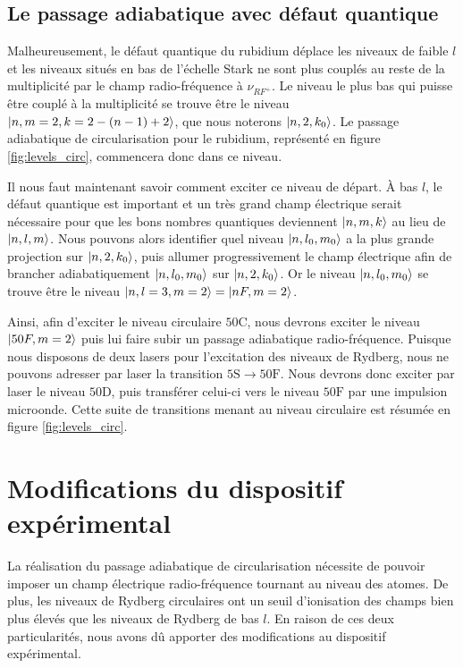 \subsection{Le passage adiabatique avec défaut quantique}
\noindent Malheureusement, le défaut quantique du rubidium déplace les niveaux de faible $l$ et les niveaux situés en bas de l'échelle Stark ne sont plus couplés au reste de la multiplicité par le champ radio-fréquence à $\nu_{RF^+}$.
Le niveau le plus bas qui puisse être couplé à la multiplicité se trouve être le niveau $\ket{n,m=2,k=2-(n-1)+2}$, que nous noterons $\ket{n,2,k_0}$.
Le passage adiabatique de circularisation pour le rubidium, représenté en figure \eqref{fig:levels_circ}, commencera donc dans ce niveau.

Il nous faut maintenant savoir comment exciter ce niveau de départ.
\`A bas $l$, le défaut quantique est important et un très grand champ électrique serait nécessaire pour que les bons nombres quantiques deviennent $\ket{n,m,k}$ au lieu de $\ket{n,l,m}$.
Nous pouvons alors identifier quel niveau $\ket{n,l_0,m_0}$ a la plus grande projection sur $\ket{n,2,k_0}$, puis allumer progressivement le champ électrique afin de brancher adiabatiquement $\ket{n,l_0,m_0}$ sur $\ket{n,2,k_0}$.
Or le niveau $\ket{n,l_0,m_0}$ se trouve être le niveau $\ket{n,l=3,m=2}=\ket{nF,m=2}$.

Ainsi, afin d'exciter le niveau circulaire $\mathrm{50C}$, nous devrons exciter le niveau $\ket{50F,m=2}$ puis lui faire subir un passage adiabatique radio-fréquence.
Puisque nous disposons de deux lasers pour l'excitation des niveaux de Rydberg, nous ne pouvons adresser par laser la transition $\mathrm{5S}\rightarrow\mathrm{50F}$.
Nous devrons donc exciter par laser le niveau $\mathrm{50D}$, puis transférer celui-ci vers le niveau $\mathrm{50F}$ par une impulsion microonde.
Cette suite de transitions menant au niveau circulaire est résumée en figure \ref{fig:levels_circ}.

\section{Modifications du dispositif expérimental}

\noindent La réalisation du passage adiabatique de circularisation nécessite de pouvoir imposer un champ électrique radio-fréquence tournant au niveau des atomes.
De plus, les niveaux de Rydberg circulaires ont un seuil d'ionisation des champs bien plus élevés que les niveaux de Rydberg de bas $l$\cite{TXT_GALLAGHER}.
En raison de ces deux particularités, nous avons dû apporter des modifications au dispositif expérimental.

